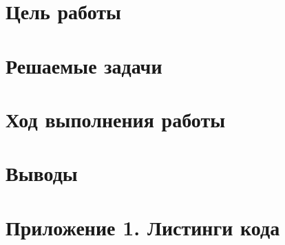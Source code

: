 






\section{Цель работы}


\section{Решаемые задачи}


\section{Ход выполнения работы}


\section{Выводы}



\section*{Приложение 1. Листинги кода}



